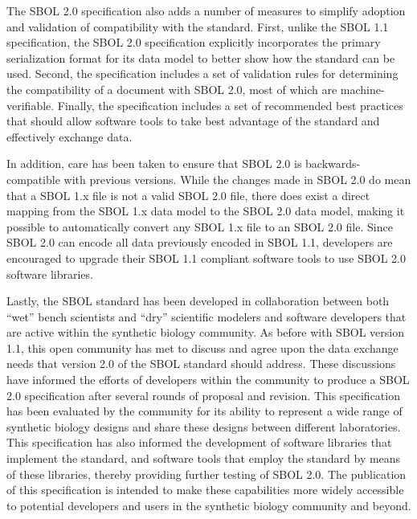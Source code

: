 The SBOL 2.0 specification also adds a number of measures to simplify adoption and validation of compatibility with the standard.
First, unlike the SBOL 1.1 specification, the SBOL 2.0 specification explicitly incorporates the primary serialization format for its data model to better show how the standard can be used. Second, the specification includes a set of validation rules for determining the compatibility of a document with SBOL 2.0, most of which are machine-verifiable. Finally, the specification includes a set of recommended best practices that should allow software tools to take best advantage of the standard and effectively exchange data.

In addition, care has been taken to ensure that SBOL 2.0 is backwards-compatible with previous versions. While the changes made in SBOL 2.0 do mean   that a SBOL 1.x file is not a valid SBOL 2.0 file, there does exist a direct mapping from the SBOL 1.x data model to the SBOL 2.0 data model, making it possible to automatically convert any SBOL 1.x file to an SBOL 2.0 file.
Since SBOL 2.0 can encode all data previously encoded in SBOL 1.1, developers are encouraged to upgrade their SBOL 1.1 compliant software tools to use SBOL 2.0 software libraries. 

Lastly, the SBOL standard has been developed in collaboration between both ``wet'' bench scientists and ``dry'' scientific modelers and software developers that are active within the synthetic biology community. As before with SBOL version 1.1, this open community has met to discuss and agree upon the data exchange needs that version 2.0 of the SBOL standard should address. 
These discussions have informed the efforts of  developers within the community to produce a SBOL 2.0 specification after several rounds of proposal and revision. This specification has been evaluated by the community for its ability to represent a wide range of synthetic biology designs and share these designs between different laboratories. 
This specification has also informed the development of software libraries that implement the standard, and software tools that employ the standard by means of these libraries, thereby providing further testing of SBOL 2.0. 
The publication of this specification is intended to make these capabilities more widely accessible to potential developers and users in the synthetic biology community and beyond.